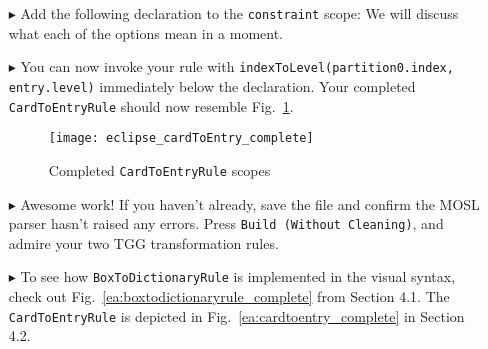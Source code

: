 \begin{itemize}

\item[$\blacktriangleright$] Add the following declaration to the \texttt{constraint} scope:  We will discuss what
each of the options mean in a moment.

\vspace{0.5cm}

\item[$\blacktriangleright$] You can now invoke your rule with \texttt{indexToLevel(partition0.index, entry.level)} immediately below the declaration. Your
completed \texttt{CardToEntryRule} should now resemble Fig.~\ref{eclipse:c2eDone}.

\begin{figure}[htbp]
\begin{center}
  \texttt{[image: eclipse\_cardToEntry\_complete]}
  \caption{Completed \texttt{CardToEntryRule} scopes}
  \label{eclipse:c2eDone}
\end{center}
\end{figure}

\vspace{0.5cm}

\item[$\blacktriangleright$] Awesome work! If you haven't already, save the file and confirm the MOSL parser hasn't raised any errors. Press \texttt{Build
(Without Cleaning)}, and admire your two TGG transformation rules. 

\vspace{0.5cm}

\item[$\blacktriangleright$] To see how \texttt{BoxToDictionaryRule} is implemented in the visual syntax, check out Fig.~\ref{ea:boxtodictionaryrule_complete}
from Section 4.1. The \texttt{CardToEntryRule} is depicted in Fig.~\ref{ea:cardtoentry_complete} in Section 4.2.

\end{itemize}
